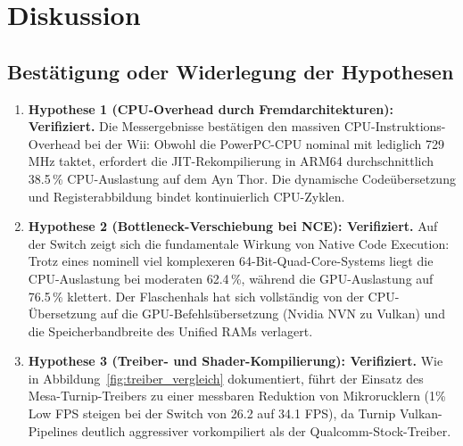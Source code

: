 \documentclass[12pt,a4paper]{scrartcl}
\begin{document}
\newpage

\section{Diskussion}
\label{sec:diskussion}

\subsection{Bestätigung oder Widerlegung der Hypothesen}
\begin{enumerate}[leftmargin=1.8em]
    \item \textbf{Hypothese 1 (CPU-Overhead durch Fremdarchitekturen): Verifiziert.} Die Messergebnisse bestätigen den massiven CPU-Instruktions-Overhead bei der Wii: Obwohl die PowerPC-CPU nominal mit lediglich 729\,MHz taktet, erfordert die JIT-Rekompilierung in ARM64 durchschnittlich 38.5\,\% CPU-Auslastung auf dem Ayn Thor. Die dynamische Codeübersetzung und Registerabbildung bindet kontinuierlich CPU-Zyklen.
    \item \textbf{Hypothese 2 (Bottleneck-Verschiebung bei NCE): Verifiziert.} Auf der Switch zeigt sich die fundamentale Wirkung von Native Code Execution: Trotz eines nominell viel komplexeren 64-Bit-Quad-Core-Systems liegt die CPU-Auslastung bei moderaten 62.4\,\%, während die GPU-Auslastung auf 76.5\,\% klettert. Der Flaschenhals hat sich vollständig von der CPU-Übersetzung auf die GPU-Befehlsübersetzung (Nvidia NVN zu Vulkan) und die Speicherbandbreite des Unified RAMs verlagert.
    \item \textbf{Hypothese 3 (Treiber- und Shader-Kompilierung): Verifiziert.} Wie in Abbildung~\ref{fig:treiber_vergleich} dokumentiert, führt der Einsatz des Mesa-Turnip-Treibers zu einer messbaren Reduktion von Mikrorucklern (1\% Low FPS steigen bei der Switch von 26.2 auf 34.1 FPS), da Turnip Vulkan-Pipelines deutlich aggressiver vorkompiliert als der Qualcomm-Stock-Treiber.
\end{enumerate}
\end{document}
